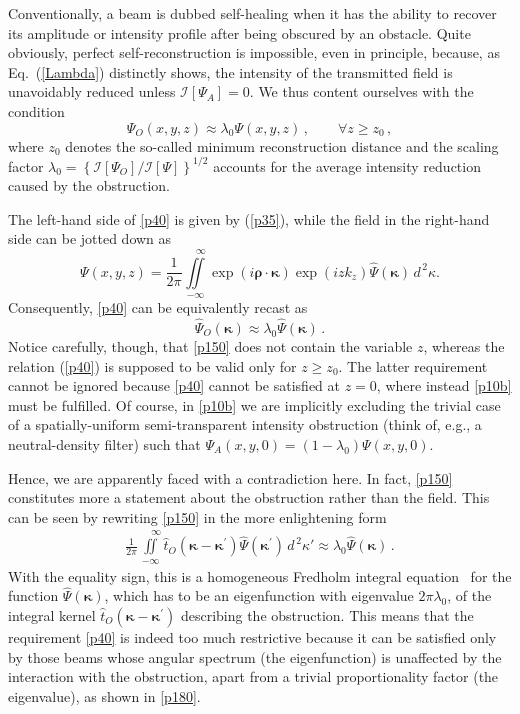 \documentclass[10pt]{article}
\newcommand{\vrho}{\bm{\rho}}
\newcommand{\vka}{\bm{\kappa}}
\newcommand{\dd}{{d^{\,2}}}
\begin{document}
Conventionally, a beam is dubbed self-healing when it has the ability
to recover its amplitude or intensity profile after being obscured by
an obstacle. Quite obviously, perfect self-reconstruction is
impossible, even in principle, because, as Eq.~(\ref{Lambda})
distinctly shows, the intensity of the transmitted field is
unavoidably reduced unless $\mathcal{I}[\Psi_{A}]=0$.  We thus content
ourselves with the condition
\begin{equation}
\label{p40}
  \Psi_O(x,y,z) \approx   \lambda_{0}  \Psi (x,y, z ) \, , 
  \qquad
  \forall z \geq z_{0} \, ,
\end{equation}
where $z_0$ denotes the so-called minimum reconstruction
  distance  and the scaling factor
$ \lambda_0= \left \{ \mathcal{I}[\Psi_O]/ \mathcal{I}[\Psi] \right
\}^{1/2} $ accounts for the average intensity reduction caused by the 
obstruction. 

The left-hand side of \eqref{p40} is given by (\ref{p35}), while the
field in the right-hand side can be jotted down as
\begin{equation}
  \label{p50}
  \Psi (x, y, z)  =  \frac{1}{2 \pi} \iint\limits_{-\infty}^{\phantom{xx}\infty}
  \exp ( i \vrho \cdot \vka )  
  \exp ( i z k_z ) 
  \widehat{\Psi} (\vka)   \, \dd \kappa. 
\end{equation}
Consequently, \eqref{p40} can be equivalently recast as
\begin{equation}
  \label{p150}
  \widehat{\Psi}_O (\vka)  \approx   \lambda_0 
  \widehat{\Psi} (\vka)   \, .
\end{equation}
Notice carefully, though, that \eqref{p150} does not contain the
variable $z$, whereas the relation (\ref{p40}) is supposed to be valid
only for $z \geq z_0$. The latter requirement cannot be ignored
because \eqref{p40} cannot be satisfied at $z=0$, where instead
\eqref{p10b} must be fulfilled. Of course, in \eqref{p10b} we are
implicitly excluding the trivial case of a spatially-uniform
semi-transparent intensity obstruction (think of, e.g., a
neutral-density filter) such that
$\Psi_A(x,y,0) = (1-\lambda_0) \Psi(x,y,0)$.

Hence, we are apparently faced with a contradiction here. In fact,
\eqref{p150} constitutes more a statement about the obstruction rather
than the field. This can be seen by rewriting \eqref{p150} in the more
enlightening form
\begin{align}
  \label{p180}
  \frac{1}{2 \pi} \iint\limits_{-\infty}^{\phantom{xx}\infty} 
  \widehat{t}_O(\vka - \vka^{\prime}) 
  \widehat{\Psi} (\vka^{\prime}) \, \dd \kappa' 
  \approx \lambda_0   \widehat{\Psi} (\vka)  \, . 
\end{align}
With the equality sign, this is a homogeneous Fredholm integral
equation~\cite{Kress:1999aa} for the function $\widehat{\Psi} (\vka)$,
which has to be an eigenfunction with eigenvalue $2 \pi \lambda_0$, of
the integral kernel $ \widehat{t}_{O} (\vka - \vka^{\prime})$
describing the obstruction.  This means that the requirement
\eqref{p40} is indeed too much restrictive because it can be satisfied
only by those beams whose angular spectrum (the eigenfunction) is
unaffected by the interaction with the obstruction, apart from a
trivial proportionality factor (the eigenvalue), as shown in
\eqref{p180}.
\end{document}
